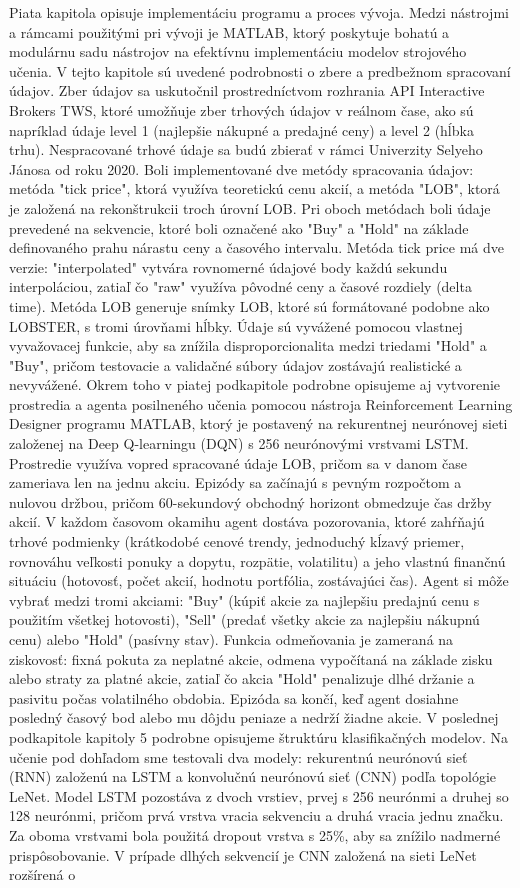 \documentclass[a4paper,oneside,onecolumn,12pt]{book}
\begin{document}
Piata kapitola opisuje implementáciu programu a proces vývoja. Medzi nástrojmi a rámcami použitými pri vývoji je MATLAB, ktorý poskytuje bohatú a modulárnu sadu nástrojov na efektívnu implementáciu modelov strojového učenia. V tejto kapitole sú uvedené podrobnosti o zbere a predbežnom spracovaní údajov. Zber údajov sa uskutočnil prostredníctvom rozhrania API Interactive Brokers TWS, ktoré umožňuje zber trhových údajov v reálnom čase, ako sú napríklad údaje level 1 (najlepšie nákupné a predajné ceny) a level 2 (hĺbka trhu). Nespracované trhové údaje sa budú zbierať v rámci Univerzity Selyeho Jánosa od roku 2020. Boli implementované dve metódy spracovania údajov: metóda "tick price", ktorá využíva teoretickú cenu akcií, a metóda "LOB", ktorá je založená na rekonštrukcii troch úrovní LOB. Pri oboch metódach boli údaje prevedené na sekvencie, ktoré boli označené ako "Buy" a "Hold" na základe definovaného prahu nárastu ceny a časového intervalu. Metóda tick price má dve verzie: "interpolated" vytvára rovnomerné údajové body každú sekundu interpoláciou, zatiaľ čo "raw" využíva pôvodné ceny a časové rozdiely (delta time). Metóda LOB generuje snímky LOB, ktoré sú formátované podobne ako LOBSTER, s tromi úrovňami hĺbky. Údaje sú vyvážené pomocou vlastnej vyvažovacej funkcie, aby sa znížila disproporcionalita medzi triedami "Hold" a "Buy", pričom testovacie a validačné súbory údajov zostávajú realistické a nevyvážené. Okrem toho v piatej podkapitole podrobne opisujeme aj vytvorenie prostredia a agenta posilneného učenia pomocou nástroja Reinforcement Learning Designer programu MATLAB, ktorý je postavený na rekurentnej neurónovej sieti založenej na Deep Q-learningu (DQN) s 256 neurónovými vrstvami LSTM. Prostredie využíva vopred spracované údaje LOB, pričom sa v danom čase zameriava len na jednu akciu. Epizódy sa začínajú s pevným rozpočtom a nulovou držbou, pričom 60-sekundový obchodný horizont obmedzuje čas držby akcií. V každom časovom okamihu agent dostáva pozorovania, ktoré zahŕňajú trhové podmienky (krátkodobé cenové trendy, jednoduchý kĺzavý priemer, rovnováhu veľkosti ponuky a dopytu, rozpätie, volatilitu) a jeho vlastnú finančnú situáciu (hotovosť, počet akcií, hodnotu portfólia, zostávajúci čas). Agent si môže vybrať medzi tromi akciami: "Buy" (kúpiť akcie za najlepšiu predajnú cenu s použitím všetkej hotovosti), "Sell" (predať všetky akcie za najlepšiu nákupnú cenu) alebo "Hold" (pasívny stav). Funkcia odmeňovania je zameraná na ziskovosť: fixná pokuta za neplatné akcie, odmena vypočítaná na základe zisku alebo straty za platné akcie, zatiaľ čo akcia "Hold" penalizuje dlhé držanie a pasivitu počas volatilného obdobia. Epizóda sa končí, keď agent dosiahne posledný časový bod alebo mu dôjdu peniaze a nedrží žiadne akcie. V poslednej podkapitole kapitoly 5 podrobne opisujeme štruktúru klasifikačných modelov. Na učenie pod dohľadom sme testovali dva modely: rekurentnú neurónovú sieť (RNN) založenú na LSTM a konvolučnú neurónovú sieť (CNN) podľa topológie LeNet. Model LSTM pozostáva z dvoch vrstiev, prvej s 256 neurónmi a druhej so 128 neurónmi, pričom prvá vrstva vracia sekvenciu a druhá vracia jednu značku. Za oboma vrstvami bola použitá dropout vrstva s 25\%, aby sa znížilo nadmerné prispôsobovanie. V prípade dlhých sekvencií je CNN založená na sieti LeNet rozšírená o 
\end{document}
